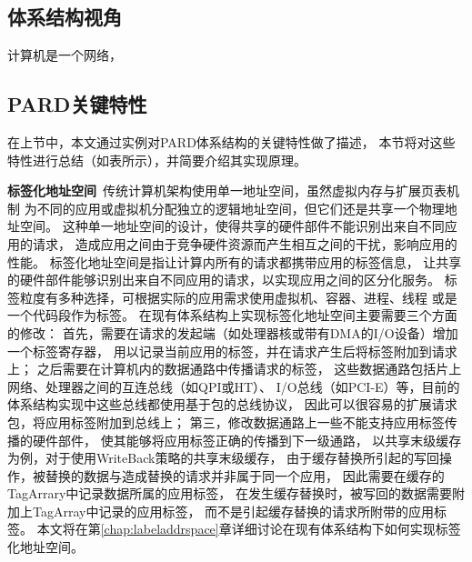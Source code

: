 \subsection{体系结构视角}

计算机是一个网络，


\subsection{PARD关键特性}

在上节中，本文通过实例对PARD体系结构的关键特性做了描述，
本节将对这些特性进行总结（如表\cite{}所示），并简要介绍其实现原理。

\textbf{标签化地址空间}\ 传统计算机架构使用单一地址空间，虽然虚拟内存与扩展页表机制
为不同的应用或虚拟机分配独立的逻辑地址空间，但它们还是共享一个物理地址空间。
这种单一地址空间的设计，使得共享的硬件部件不能识别出来自不同应用的请求，
造成应用之间由于竞争硬件资源而产生相互之间的干扰，影响应用的性能。
标签化地址空间是指让计算内所有的请求都携带应用的标签信息，
让共享的硬件部件能够识别出来自不同应用的请求，以实现应用之间的区分化服务。
标签粒度有多种选择，可根据实际的应用需求使用虚拟机、容器、进程、线程
或是一个代码段作为标签。
在现有体系结构上实现标签化地址空间主要需要三个方面的修改：
首先，需要在请求的发起端（如处理器核或带有DMA的I/O设备）增加一个标签寄存器，
用以记录当前应用的标签，并在请求产生后将标签附加到请求上；
之后需要在计算机内的数据通路中传播请求的标签，
这些数据通路包括片上网络、处理器之间的互连总线（如QPI或HT）、
I/O总线（如PCI-E）等，目前的体系结构实现中这些总线都使用基于包的总线协议，
因此可以很容易的扩展请求包，将应用标签附加到总线上；
第三，修改数据通路上一些不能支持应用标签传播的硬件部件，
使其能够将应用标签正确的传播到下一级通路，
以共享末级缓存为例，对于使用WriteBack策略的共享末级缓存，
由于缓存替换所引起的写回操作，被替换的数据与造成替换的请求并非属于同一个应用，
因此需要在缓存的TagArrary中记录数据所属的应用标签，
在发生缓存替换时，被写回的数据需要附加上TagArray中记录的应用标签，
而不是引起缓存替换的请求所附带的应用标签。
本文将在第\ref{chap:labeladdrspace}章详细讨论在现有体系结构下如何实现标签化地址空间。


